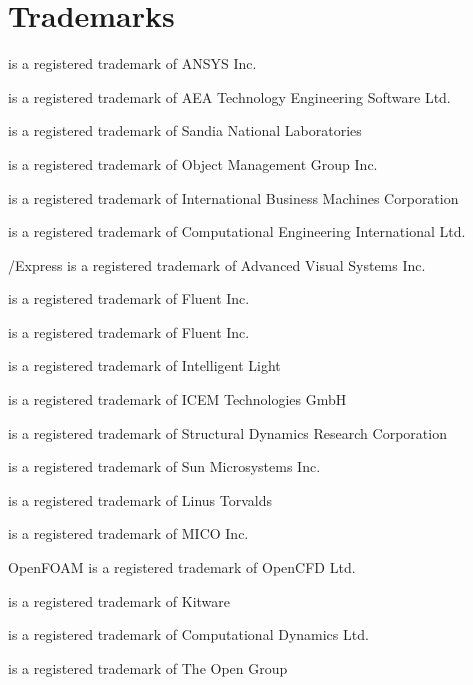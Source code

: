 
\section*{Trademarks}
 is a registered trademark of ANSYS Inc.\par
{} is a registered trademark of AEA Technology Engineering Software Ltd.\par
{} is a registered trademark of Sandia National Laboratories\par
{} is a registered trademark of Object Management Group Inc.\par
{} is a registered trademark of International Business Machines Corporation\par
{} is a registered trademark of Computational Engineering International Ltd.\par
{}/Express is a registered trademark of Advanced Visual Systems Inc.\par
{} is a registered trademark of Fluent Inc.\par
{} is a registered trademark of Fluent Inc.\par
{} is a registered trademark of Intelligent Light\par
{} is a registered trademark of ICEM Technologies GmbH\par
{} is a registered trademark of Structural Dynamics Research Corporation\par
{} is a registered trademark of Sun Microsystems Inc.\par
{} is a registered trademark of Linus Torvalds\par
{} is a registered trademark of MICO Inc.\par
OpenFOAM is a registered trademark of OpenCFD Ltd.\par
{} is a registered trademark of Kitware\par
{} is a registered trademark of Computational Dynamics Ltd.\par
{} is a registered trademark of The Open Group\par
